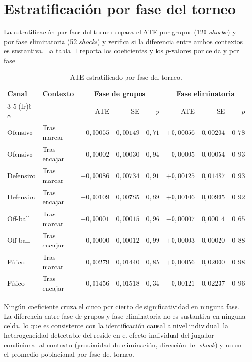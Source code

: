 \section{Estratificación por fase del torneo}
\label{anexo:val-stage}

La estratificación por fase del torneo separa el ATE por grupos
(120 \textit{shocks}) y por fase eliminatoria (52 \textit{shocks}) y
verifica si la diferencia entre ambos contextos es sustantiva. La
tabla~\ref{tab:stage} reporta los coeficientes y los $p$-valores por
celda y por fase.

\begin{table}[h]
  \centering
  \small
  \caption{ATE estratificado por fase del torneo.}
  \label{tab:stage}
  \begin{tabular}{llrrrrrr}
    \toprule
    \multirow{2}{*}{Canal} & \multirow{2}{*}{Contexto} & \multicolumn{3}{c}{Fase de grupos} & \multicolumn{3}{c}{Fase eliminatoria} \\
    \cmidrule(lr){3-5} \cmidrule(lr){6-8}
                              &              & ATE & SE & $p$ & ATE & SE & $p$ \\
    \midrule
    Ofensivo  & Tras marcar  & $+0{,}00055$ & $0{,}00149$ & $0{,}71$ & $+0{,}00056$ & $0{,}00204$ & $0{,}78$ \\
    Ofensivo  & Tras encajar & $+0{,}00002$ & $0{,}00030$ & $0{,}94$ & $-0{,}00005$ & $0{,}00054$ & $0{,}93$ \\
    Defensivo & Tras marcar  & $-0{,}00086$ & $0{,}00734$ & $0{,}91$ & $+0{,}00125$ & $0{,}01487$ & $0{,}93$ \\
    Defensivo & Tras encajar & $+0{,}00109$ & $0{,}00785$ & $0{,}89$ & $+0{,}00106$ & $0{,}00995$ & $0{,}92$ \\
    Off-ball  & Tras marcar  & $+0{,}00001$ & $0{,}00015$ & $0{,}96$ & $-0{,}00007$ & $0{,}00014$ & $0{,}65$ \\
    Off-ball  & Tras encajar & $-0{,}00000$ & $0{,}00012$ & $0{,}99$ & $+0{,}00003$ & $0{,}00020$ & $0{,}88$ \\
    Físico    & Tras marcar  & $-0{,}00279$ & $0{,}01440$ & $0{,}85$ & $+0{,}00056$ & $0{,}02000$ & $0{,}98$ \\
    Físico    & Tras encajar & $-0{,}01456$ & $0{,}01518$ & $0{,}34$ & $-0{,}00121$ & $0{,}02237$ & $0{,}96$ \\
    \bottomrule
  \end{tabular}
\end{table}

Ningún coeficiente cruza el cinco por ciento de significatividad en
ninguna fase. La diferencia entre fase de grupos y fase eliminatoria
no es sustantiva en ninguna celda, lo que es consistente con la
identificación causal a nivel individual: la heterogeneidad
detectable del \CCV{} reside en el efecto individual del jugador
condicional al contexto (proximidad de eliminación, dirección del
\textit{shock}) y no en el promedio poblacional por fase del torneo.

